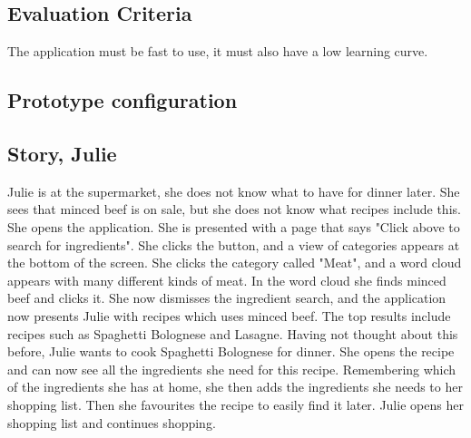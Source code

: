 \subsection*{Evaluation Criteria}

The application must be fast to use, it must also have a low learning curve.

\subsection*{Prototype configuration}

\subsection*{Story, Julie}

Julie is at the supermarket, she does not know what to have for dinner later. She sees that minced beef is on sale, but she does not know what recipes include this. She opens the application. She is presented with a page that says "Click above to search for ingredients". She clicks the button, and a view of categories appears at the bottom of the screen. She clicks the category called "Meat", and a word cloud appears with many different kinds of meat. In the word cloud she finds minced beef and clicks it. She now dismisses the ingredient search, and the application now presents Julie with recipes which uses minced beef. The top results include recipes such as Spaghetti Bolognese and Lasagne. Having not thought about this before, Julie wants to cook Spaghetti Bolognese for dinner. She opens the recipe and can now see all the ingredients she need for this recipe. Remembering which of the ingredients she has at home, she then adds the ingredients she needs to her shopping list. Then she favourites the recipe to easily find it later. Julie opens her shopping list and continues shopping.


